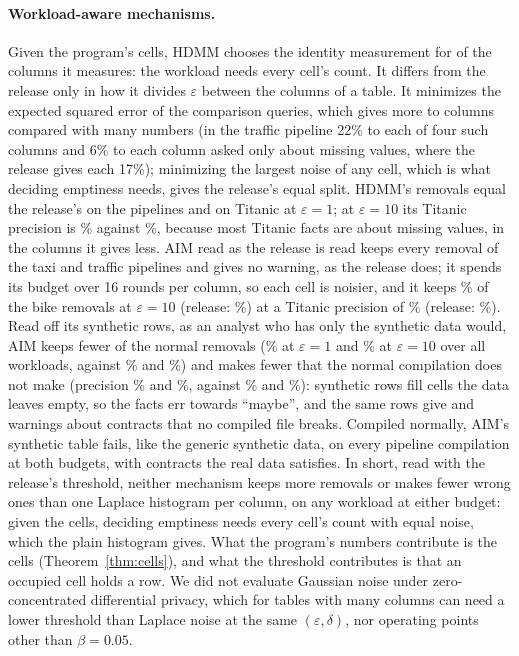 \paragraph{Workload-aware mechanisms.} Given the program's cells, HDMM chooses the identity measurement
for \PrivHdmmIdentity{} of the \PrivHdmmBlocks{} columns it measures: the workload needs every cell's count. It
differs from the release only in how it divides $\varepsilon$ between the columns of a table. It minimizes
the expected squared error of the comparison queries, which gives more to columns compared with many
numbers (in the traffic pipeline 22\% to each of four such columns and 6\% to each column asked only about
missing values, where the release gives each 17\%); minimizing the largest noise of any cell, which is
what deciding emptiness needs, gives the release's equal split. HDMM's removals equal the release's on
the pipelines and on Titanic at $\varepsilon = 1$; at $\varepsilon = 10$ its Titanic precision is
\PrivHdmmTitanicEpsTenPrecision\% against \PrivProgTitanicEpsTenPrecision\%, because most Titanic facts are
about missing values, in the columns it gives less. AIM read as the release is read keeps every removal of
the taxi and traffic pipelines and gives no warning, as the release does; it spends its budget over 16
rounds per column, so each cell is noisier, and it keeps \PrivAimMargBikesEpsTenRecall\% of the bike
removals at $\varepsilon = 10$ (release: \PrivProgBikesEpsTenRecall\%) at a Titanic precision of
\PrivAimMargTitanicEpsTenPrecision\% (release: \PrivProgTitanicEpsTenPrecision\%). Read off its synthetic
rows, as an analyst who has only the synthetic data would, AIM keeps fewer of the normal removals
(\PrivAimAllEpsOneRecall\% at $\varepsilon = 1$ and \PrivAimAllEpsTenRecall\% at $\varepsilon = 10$ over all
workloads, against \PrivProgAllEpsOneRecall\% and \PrivProgAllEpsTenRecall\%) and makes fewer that the normal
compilation does not make (precision \PrivAimAllEpsOnePrecision\% and \PrivAimAllEpsTenPrecision\%, against
\PrivProgAllEpsOnePrecision\% and \PrivProgAllEpsTenPrecision\%): synthetic rows fill cells the data leaves
empty, so the facts err towards ``maybe'', and the same rows give \PrivAimAllEpsOneWarnings{} and
\PrivAimAllEpsTenWarnings{} warnings about contracts that no compiled file breaks. Compiled normally, AIM's
synthetic table fails, like the generic synthetic data, on every pipeline compilation at both budgets, with
contracts the real data satisfies. In short, read with the release's threshold, neither mechanism keeps
more removals or makes fewer wrong ones than one Laplace histogram per column, on any workload at either
budget: given the cells, deciding emptiness needs every cell's count with equal noise, which the plain
histogram gives. What the program's numbers contribute is the cells (Theorem~\ref{thm:cells}), and what
the threshold contributes is that an occupied cell holds a row. We did not evaluate Gaussian noise under
zero-concentrated differential privacy, which for tables with many columns can need a lower threshold than
Laplace noise at the same $(\varepsilon, \delta)$, nor operating points other than $\beta = 0.05$.

